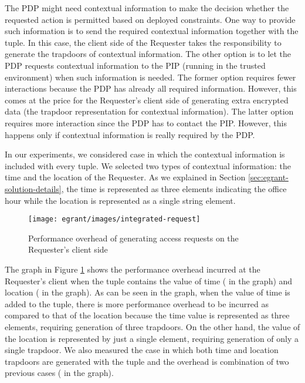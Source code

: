 \documentclass[epsfig,a4paper,11pt,titlepage]{book}
\numberwithin{algorithm}{chapter}
\begin{document}
The \gls{PDP} might need contextual information to make the decision whether the requested action is permitted based on deployed constraints. One way to provide such information is to send the required contextual information together with the  tuple. In this case, the client side of the Requester takes the responsibility to generate the trapdoors of contextual information. The other option is to let the \gls{PDP} requests contextual information to the \gls{PIP} (running in the trusted environment) when such information is needed. The former option requires fewer interactions because the \gls{PDP} has already all required information. However, this comes at the price for the Requester's client side of generating extra encrypted data (the trapdoor representation for contextual information). The latter option requires more interaction since the \gls{PDP} has to contact the \gls{PIP}. However, this happens only if contextual information is really required by the \gls{PDP}.

In our experiments, we considered case in which the contextual information is included with every  tuple. We selected two types of contextual information: the time and the location of the Requester. As we explained in Section \ref{sec:egrant-solution-details}, the time  is represented as three elements indicating the office hour while the location  is represented as a single string element.

\begin{figure} [htp]
\centering
\texttt{[image: egrant/images/integrated-request]}
\caption[Performance overhead of generating access requests]{Performance overhead of generating access requests on the Requester's client side}
\label{fig:egrant-integrated-request}
\end{figure}

The graph in Figure \ref{fig:egrant-integrated-request} shows the performance overhead incurred at the Requester's client when the  tuple contains the value of time  ( in the graph) and location  ( in the graph). As can be seen in the graph, when the value of time is added to the  tuple, there is more performance overhead to be incurred as compared to that of the location because the time value  is represented as three elements, requiring generation of three trapdoors. On the other hand, the value  of the location is represented by just a single element, requiring generation of only a single trapdoor. We also measured the case in which both time and location trapdoors are generated with the  tuple and the overhead is combination of two previous cases ( in the graph).
\end{document}
